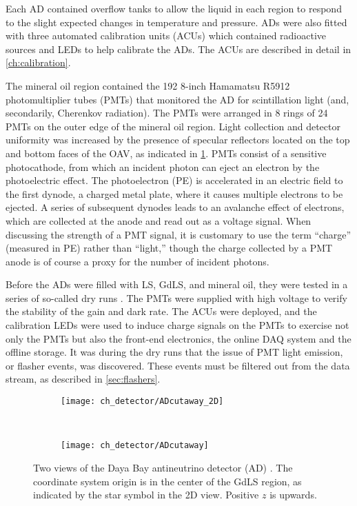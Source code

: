 Each AD contained overflow tanks to allow the liquid in each region
to respond to the slight expected changes in temperature and pressure.
ADs were also fitted with three automated calibration units (ACUs)
which contained radioactive sources and LEDs to help calibrate the ADs.
The ACUs are described in detail in \cref{ch:calibration}.

The mineral oil region contained the 192 8-inch Hamamatsu R5912
photomultiplier tubes (PMTs) that monitored the AD for scintillation light
(and, secondarily, Cherenkov radiation).
The PMTs were arranged in 8 rings of 24 PMTs on the outer edge of the mineral oil region.
Light collection and detector uniformity was increased by the presence of
specular reflectors located on the top and bottom faces of the OAV,
as indicated in \cref{fig:ad_cutaway}.
PMTs consist of a sensitive photocathode, from which an incident photon
can eject an electron by the photoelectric effect.
The photoelectron (PE) is accelerated in an electric field to the first dynode,
a charged metal plate, where it causes multiple electrons to be ejected.
A series of subsequent dynodes leads to an avalanche effect of electrons,
which are collected at the anode and read out as a voltage signal.
When discussing the strength of a PMT signal,
it is customary to use the term ``charge'' (measured in PE)
rather than ``light,''
though the charge collected by a PMT anode
is of course a proxy for the number of incident photons.

Before the ADs were filled with LS, GdLS, and mineral oil,
they were tested in a series of so-called dry runs \cite{dryrun1}.
The PMTs were supplied with high voltage
to verify the stability of the gain and dark rate.
The ACUs were deployed, and the calibration LEDs
were used to induce charge signals on the PMTs
to exercise not only the PMTs but also the front-end electronics,
the online DAQ system and the offline storage.
It was during the dry runs that the issue of PMT light emission,
or flasher events, was discovered.
These events must be filtered out from the data stream,
as described in \cref{sec:flashers}.

\begin{figure}
    \centering
    \begin{subfigure}{\textwidth}
        \centering
        \texttt{[image: ch\_detector/ADcutaway\_2D]}
    \end{subfigure}
    \vspace{1cm}\\
    \begin{subfigure}[0.4\textheight]{\textwidth}
        \centering
        \texttt{[image: ch\_detector/ADcutaway]}
    \end{subfigure}
    \caption[Layout of a Daya Bay AD]{
        Two views of the Daya Bay antineutrino detector (AD)
        \cite{ngd2016,internal_files}.
        The coordinate system origin is in the center of the GdLS region,
        as indicated by the star symbol in the 2D view.
        Positive $z$ is upwards.
    }
    \label{fig:ad_cutaway}
\end{figure}

